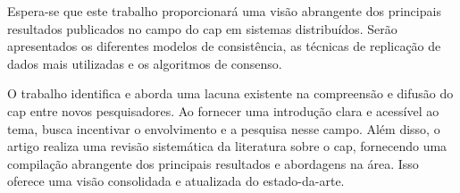 Espera-se que este trabalho proporcionará uma visão abrangente dos principais resultados publicados no campo do \gls{cap} em sistemas distribuídos. Serão apresentados os diferentes modelos de consistência, as técnicas de replicação de dados mais utilizadas e os algoritmos de consenso.

O trabalho identifica e aborda uma lacuna existente na compreensão e difusão do \gls{cap} entre novos pesquisadores. Ao fornecer uma introdução clara e acessível ao tema, busca incentivar o envolvimento e a pesquisa nesse campo. Além disso, o artigo realiza uma revisão sistemática da literatura sobre o \gls{cap}, fornecendo uma compilação abrangente dos principais resultados e abordagens na área. Isso oferece uma visão consolidada e atualizada do estado-da-arte.